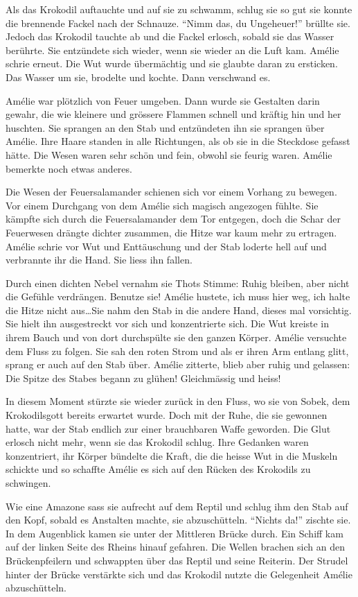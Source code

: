 \documentclass[11pt,titlepage,a5paper]{book}
\begin{document}
Als das Krokodil auftauchte und auf sie zu schwamm, schlug sie so gut sie konnte die brennende Fackel nach der Schnauze. "`Nimm das, du Ungeheuer!"' brüllte sie. Jedoch das Krokodil tauchte ab und die Fackel erlosch, sobald sie das Wasser berührte. Sie entzündete sich wieder, wenn sie wieder an die Luft kam. Amélie schrie erneut. Die Wut wurde übermächtig und sie glaubte daran zu ersticken. Das Wasser um sie, brodelte und kochte. Dann  verschwand es.

Amélie war plötzlich von Feuer umgeben. Dann wurde sie Gestalten darin gewahr, die wie kleinere und grössere Flammen schnell und kräftig hin und her huschten. Sie sprangen an den Stab und entzündeten ihn sie sprangen über Amélie. Ihre Haare standen in alle Richtungen, als ob sie in die Steckdose gefasst hätte. Die Wesen waren sehr schön und fein, obwohl sie feurig waren. Amélie bemerkte noch etwas anderes.

Die Wesen der Feuersalamander schienen sich vor einem Vorhang zu bewegen. Vor einem Durchgang von dem Amélie sich magisch angezogen fühlte. Sie kämpfte sich durch die Feuersalamander dem Tor entgegen, doch die Schar der Feuerwesen drängte dichter zusammen, die Hitze war kaum mehr zu ertragen. Amélie schrie vor Wut und Enttäuschung und der Stab loderte hell auf und verbrannte ihr die Hand. Sie liess ihn fallen.

Durch einen dichten Nebel vernahm sie Thots Stimme: Ruhig bleiben, aber nicht die Gefühle verdrängen. Benutze sie! Amélie hustete, ich muss hier weg, ich halte die Hitze nicht aus\dots Sie nahm den Stab in die andere Hand, dieses mal vorsichtig. Sie hielt ihn ausgestreckt vor sich und konzentrierte sich. Die Wut kreiste in ihrem Bauch und von dort durchspülte sie den ganzen Körper. Amélie versuchte dem Fluss zu folgen. Sie sah den roten Strom und als er ihren Arm entlang glitt, sprang er auch auf den Stab über. Amélie zitterte, blieb aber ruhig und gelassen: Die Spitze des Stabes begann zu glühen! Gleichmässig und heiss!

In diesem Moment stürzte sie wieder zurück in den Fluss, wo sie von Sobek, dem Krokodilsgott bereits erwartet wurde. Doch mit der Ruhe, die sie gewonnen hatte, war der Stab endlich zur einer brauchbaren Waffe geworden. Die Glut erlosch nicht mehr, wenn sie das Krokodil schlug. Ihre Gedanken waren konzentriert, ihr Körper bündelte die Kraft, die die heisse Wut in die Muskeln schickte und so schaffte Amélie es sich auf den Rücken des Krokodils zu schwingen.

Wie eine Amazone sass sie aufrecht auf dem Reptil und schlug ihm den Stab auf den Kopf, sobald es Anstalten machte, sie abzuschütteln. "`Nichts da!"' zischte sie. In dem Augenblick kamen sie unter der Mittleren Brücke durch. Ein Schiff kam auf der linken Seite des Rheins hinauf gefahren. Die Wellen brachen sich an den Brückenpfeilern und schwappten über das Reptil und seine Reiterin. Der Strudel hinter der Brücke verstärkte sich und das Krokodil nutzte die Gelegenheit Amélie abzuschütteln. 
\end{document}
